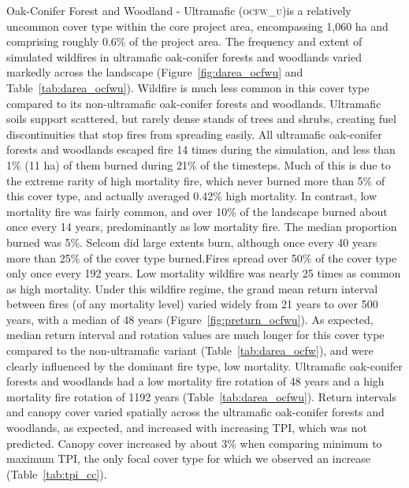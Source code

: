 Oak-Conifer Forest and Woodland - Ultramafic (\textsc{ocfw\_u})is a relatively uncommon cover type within the core project area, encompassing 1,060 ha and comprising roughly 0.6\% of the project area. The frequency and extent of simulated wildfires in ultramafic oak-conifer forests and woodlands varied markedly across the landscape (Figure~\ref{fig:darea_ocfwu} and Table~\ref{tab:darea_ocfwu}). %
%
Wildfire is much less common in this cover type compared to its non-ultramafic oak-conifer forests and woodlands. Ultramafic soils support scattered, but rarely dense stands of trees and shrubs, creating fuel discontinuities that stop fires from spreading easily. All ultramafic oak-conifer forests and woodlands escaped fire 14 times during the simulation, and less than 1\% (11 ha) of them burned during 21\% of the timesteps. Much of this is due to the extreme rarity of high mortality fire, which never burned more than 5\% of this cover type, and actually averaged 0.42\% high mortality. In contrast, low mortality fire was fairly common, and over 10\% of the landscape burned about once every 14 years, predominantly as low mortality fire. The median proportion burned was 5\%. Selcom did large extents burn, although once every 40 years more than 25\% of the cover type burned.Fires spread over 50\% of the cover type only once every 192 years. Low mortality wildfire was nearly 25 times as common as high mortality. %
%
Under this wildfire regime, the grand mean return interval between fires (of any mortality level) varied widely from 21 years to over 500 years, with a median of 48 years (Figure~\ref{fig:preturn_ocfwu}). As expected, median return interval and rotation values are much longer for this cover type compared to the non-ultramafic variant (Table~\ref{tab:darea_ocfw}), and were clearly influenced by the dominant fire type, low mortality. Ultramafic oak-conifer forests and woodlands had a low mortality fire rotation of 48 years and a high mortality fire rotation of 1192 years (Table~\ref{tab:darea_ocfwu}).  %
%
Return intervals and canopy cover varied spatially across the ultramafic oak-conifer forests and woodlands, as expected, and increased with increasing TPI, which was not predicted. Canopy cover increased by about 3\% when comparing minimum to maximum TPI, the only focal cover type for which we observed an increase (Table~\ref{tab:tpi_cc}). 


